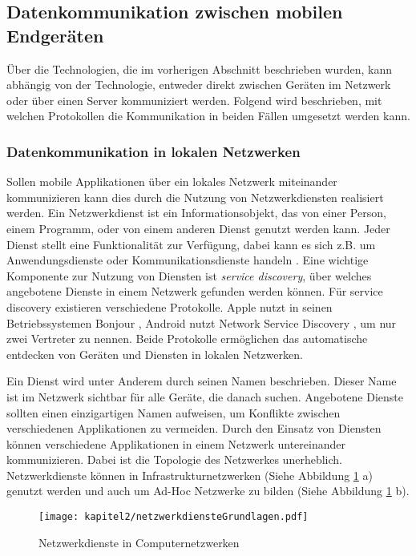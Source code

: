 \subsection{Datenkommunikation zwischen mobilen Endgeräten}
Über die Technologien, die im vorherigen Abschnitt beschrieben wurden, kann abhängig von der Technologie, entweder direkt zwischen Geräten im Netzwerk oder über einen Server kommuniziert werden. Folgend wird beschrieben, mit welchen Protokollen die Kommunikation in beiden Fällen umgesetzt werden kann. 

\subsubsection{Datenkommunikation in lokalen Netzwerken}
Sollen mobile Applikationen über ein lokales Netzwerk miteinander kommunizieren kann dies durch die Nutzung von Netzwerkdiensten realisiert werden. Ein Netzwerkdienst ist ein Informationsobjekt, das von einer Person, einem Programm, oder von einem anderen Dienst genutzt werden kann. Jeder Dienst stellt eine Funktionalität zur Verfügung, dabei kann es sich z.B. um Anwendungsdienste oder Kommunikationsdienste handeln \cite{cheng2002service}.  Eine wichtige Komponente zur Nutzung von Diensten ist \textit{service discovery}, über welches angebotene Dienste in einem Netzwerk gefunden werden können. Für service discovery existieren verschiedene Protokolle. Apple nutzt in seinen Betriebssystemen Bonjour \cite{AboutBonjour:Online}, Android nutzt Network Service Discovery \cite{AndroidDiscovery:Online}, um nur zwei Vertreter zu nennen. Beide Protokolle ermöglichen das automatische entdecken von Geräten und Diensten in lokalen Netzwerken.

Ein Dienst wird unter Anderem durch seinen Namen beschrieben. Dieser Name ist im Netzwerk sichtbar für alle Geräte, die danach suchen. Angebotene Dienste sollten einen einzigartigen Namen aufweisen, um Konflikte zwischen verschiedenen Applikationen zu vermeiden. Durch den Einsatz von Diensten können verschiedene Applikationen in einem Netzwerk untereinander kommunizieren. Dabei ist die Topologie des Netzwerkes unerheblich. Netzwerkdienste können in Infrastrukturnetzwerken (Siehe Abbildung \ref{fig:diensteGrund} a) genutzt werden und auch um Ad-Hoc Netzwerke zu bilden (Siehe Abbildung \ref{fig:diensteGrund} b).

\begin{figure}[H]
  \centering
  \texttt{[image: kapitel2/netzwerkdiensteGrundlagen.pdf]}
  \caption{Netzwerkdienste in Computernetzwerken}
  \label{fig:diensteGrund}
\end{figure}

